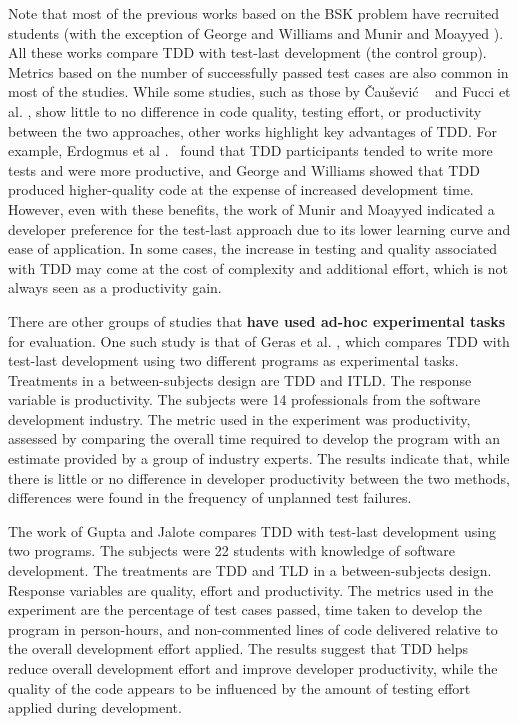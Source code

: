 Note that most of the previous works based on the BSK problem have recruited students (with the exception of George and Williams \cite{George2004} and Munir and Moayyed \cite{Munir2014}). All these works compare TDD with test-last development (the control group). Metrics based on the number of successfully passed test cases are also common in most of the studies. While some studies, such as those by \v Cau\v sevi\'c ~\cite{Causevic2012} and Fucci et al. \cite{Fucci2016}, show little to no difference in code quality, testing effort, or productivity between the two approaches, other works highlight key advantages of TDD. For example, Erdogmus et al .~\cite{Erdogmus2005} found that TDD participants tended to write more tests and were more productive, and George and Williams \cite{George2004} showed that TDD produced higher-quality code at the expense of increased development time. However, even with these benefits, the work of Munir and Moayyed \cite{Munir2014} indicated a developer preference for the test-last approach due to its lower learning curve and ease of application. In some cases, the increase in testing and quality associated with TDD may come at the cost of complexity and additional effort, which is not always seen as a productivity gain. 


There are other groups of studies that \textbf{have used ad-hoc experimental tasks} for evaluation. One such study is that of Geras et al. \cite{Geras2004}, which compares TDD with test-last development using two different programs as experimental tasks. Treatments in a between-subjects design are TDD and ITLD. The response variable is productivity. %
The subjects were 14 professionals from the software development industry. The metric used in the experiment was productivity, assessed by comparing the overall time required to develop the program with an estimate provided by a group of industry experts. The results indicate that, while there is little or no difference in developer productivity between the two methods, differences were found in the frequency of unplanned test failures. %


The work of Gupta and Jalote \cite{Gupta2007} compares TDD with test-last development using two programs. %
The subjects were 22 students with knowledge of software development. The treatments are TDD and TLD in a between-subjects design. Response variables are quality, effort and productivity. The metrics used in the experiment are the percentage of test cases passed, time taken to develop the program in person-hours, and non-commented lines of code delivered relative to the overall development effort applied. The results suggest that TDD helps reduce overall development effort and improve developer productivity, while the quality of the code appears to be influenced by the amount of testing effort applied during development.


